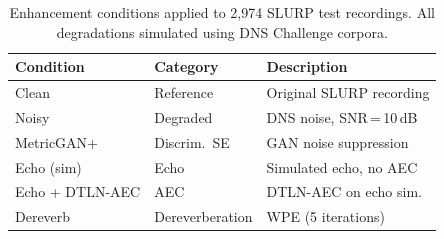 \begin{table}[t]
  \centering
  \begin{tabular}{lll}
    \hline
    \textbf{Condition} & \textbf{Category} & \textbf{Description} \\
    \hline
    Clean      & Reference       & Original SLURP recording \\
    Noisy      & Degraded        & DNS noise, SNR\,=\,10\,dB \\
    MetricGAN+ & Discrim.\ SE    & GAN noise suppression \\
    Echo (sim) & Echo            & Simulated echo, no AEC \\
    Echo + DTLN-AEC & AEC        & DTLN-AEC on echo sim. \\
    Dereverb   & Dereverberation & WPE (5 iterations) \\
    \hline
  \end{tabular}
  \caption{Enhancement conditions applied to 2{,}974 SLURP test
    recordings. All degradations simulated using DNS Challenge corpora.}
  \label{tab:conditions}
\end{table}